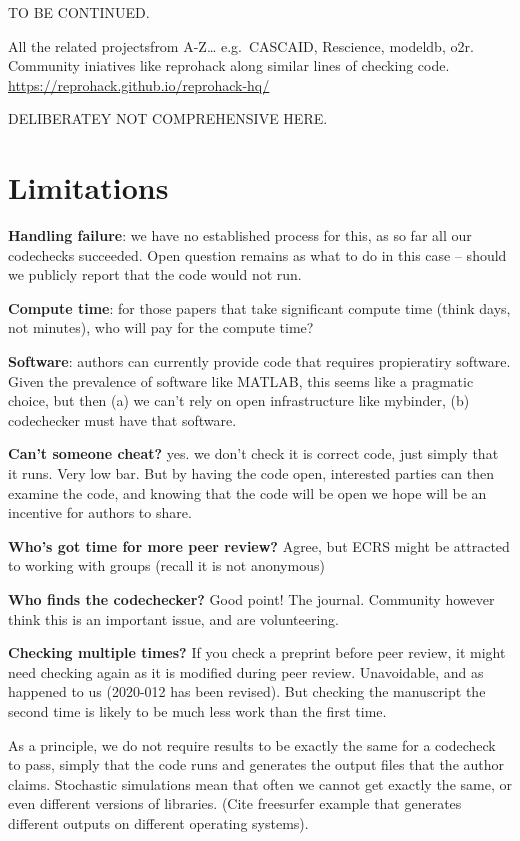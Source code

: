 \documentclass[12pt]{article}
\begin{document}
TO BE CONTINUED.

All the related projectsfrom A-Z\ldots{} e.g.~CASCAID, Rescience,
modeldb, o2r. Community iniatives like reprohack along similar lines of
checking code. \url{https://reprohack.github.io/reprohack-hq/}

DELIBERATEY NOT COMPREHENSIVE HERE.

\section*{Limitations}\label{limitations}

\textbf{Handling failure}: we have no established process for this, as
so far all our codechecks succeeded. Open question remains as what to do
in this case -- should we publicly report that the code would not run.

\textbf{Compute time}: for those papers that take significant compute
time (think days, not minutes), who will pay for the compute time?

\textbf{Software}: authors can currently provide code that requires
propieratiry software. Given the prevalence of software like MATLAB,
this seems like a pragmatic choice, but then (a) we can't rely on open
infrastructure like mybinder, (b) codechecker must have that software.

\textbf{Can't someone cheat?} yes. we don't check it is correct code,
just simply that it runs. Very low bar. But by having the code open,
interested parties can then examine the code, and knowing that the code
will be open we hope will be an incentive for authors to share.

\textbf{Who's got time for more peer review?} Agree, but ECRS might be
attracted to working with groups (recall it is not anonymous)

\textbf{Who finds the codechecker?} Good point! The journal. Community
however think this is an important issue, and are volunteering.

\textbf{Checking multiple times?}  If you check a preprint before peer
review, it might need checking again as it is modified during peer
review.  Unavoidable, and as happened to us (2020-012 has been
revised).  But checking the manuscript the second time is likely to be
much less work than the first time.

As a principle, we do not require results to be exactly the same for a
codecheck to pass, simply that the code runs and generates the output
files that the author claims. Stochastic simulations mean that often
we cannot get exactly the same, or even different versions of
libraries.  (Cite freesurfer example \cite{Gronenschild2012-pp} that
generates different outputs on different operating systems).
\end{document}
